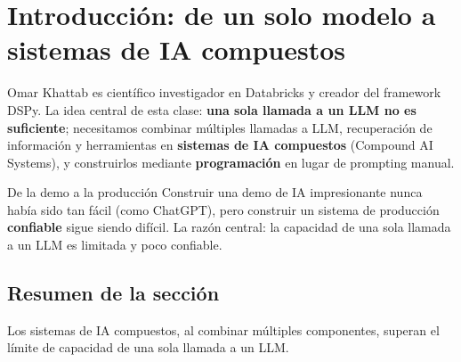\section{Introducción: de un solo modelo a sistemas de IA compuestos}

Omar Khattab es científico investigador en Databricks y creador del framework DSPy. La idea central de esta clase: \textbf{una sola llamada a un LLM no es suficiente}; necesitamos combinar múltiples llamadas a LLM, recuperación de información y herramientas en \textbf{sistemas de IA compuestos} (Compound AI Systems), y construirlos mediante \textbf{programación} en lugar de prompting manual.

\begin{importantbox}{De la demo a la producción}
Construir una demo de IA impresionante nunca había sido tan fácil (como ChatGPT), pero construir un sistema de producción \textbf{confiable} sigue siendo difícil. La razón central: la capacidad de una sola llamada a un LLM es limitada y poco confiable.
\end{importantbox}

\subsection{Resumen de la sección}

Los sistemas de IA compuestos, al combinar múltiples componentes, superan el límite de capacidad de una sola llamada a un LLM.
